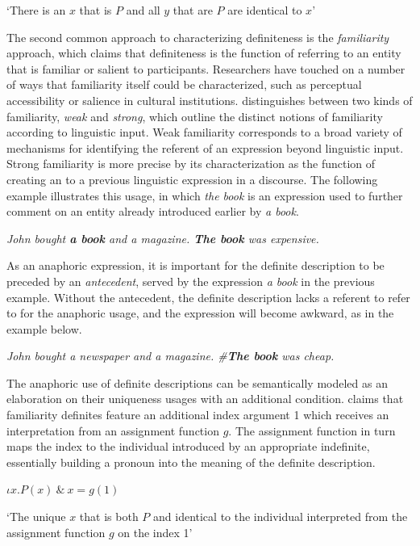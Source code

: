 \documentclass[output=paper,modfonts,nonflat]{langsci/langscibook}
\begin{document}
`There is an $x$ that is $P$ and all $y$ that are $P$ are identical to $x$' \citep[3]{Schwarz2013}
\z 

The second common approach to characterizing definiteness is the \textit{familiarity} approach, which claims that definiteness is the function of referring to an entity that is familiar or salient to  participants.  Researchers have touched on a number of ways that familiarity itself could be characterized, such as perceptual accessibility or salience in cultural institutions.  \citet{Roberts2003} distinguishes between two kinds of familiarity, \textit{weak} and \textit{strong}, which outline the distinct notions of familiarity according to linguistic input. Weak familiarity corresponds to a broad variety of mechanisms for identifying the referent of an expression beyond linguistic input.  Strong familiarity is more precise by its characterization as the function of creating an  to a previous linguistic expression in a discourse.  The following example illustrates this usage, in which \textit{the book} is an expression used to further comment on an entity already introduced earlier by \textit{a book}.
 
\ea \label{ex:cisneros:5}
\textit{John bought \textbf{a book} and a magazine.  \textbf{The book} was expensive.} \citep[3]{Schwarz2013}
\z 

As an anaphoric expression, it is important for the definite description to be preceded by an \textit{antecedent}, served by the expression \textit{a book} in the previous example.  Without the antecedent, the definite description lacks a referent to refer to for the anaphoric usage, and the expression will become awkward, as in the example below.

\ea \label{ex:cisneros:6}
\textit{John bought a newspaper and a magazine.  \textnormal{\#}\textbf{The book} was cheap.}
\z  

The anaphoric use of definite descriptions can be semantically modeled as an elaboration on their uniqueness usages with an additional condition.  \citet{Schwarz2009} claims that familiarity definites feature an additional index argument 1 which receives an interpretation from an assignment function $g$.  The assignment function in turn maps the index to the individual introduced by an appropriate indefinite, essentially building a pronoun into the meaning of the definite description.

\begin{exe}
\ex \label{ex:cisneros:7}
$\iota x.P(x)\ \&\ x = g(1)$

`The unique $x$ that is both $P$ and identical to the individual interpreted from the assignment function $g$ on the index 1'
\end{exe}
\end{document}
